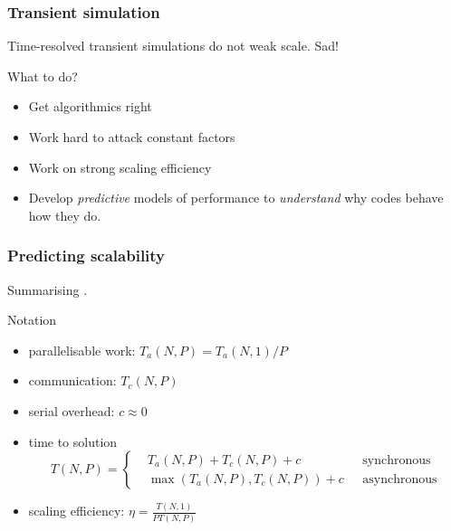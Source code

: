\documentclass[presentation]{beamer}
\begin{document}
\begin{frame}
  \frametitle{Transient simulation}
  {\large
    Time-resolved transient simulations do not weak scale. Sad!
  }

  \begin{block}{What to do?}
    \begin{itemize}
    \item Get algorithmics right
    \item Work hard to attack constant factors
    \item Work on strong scaling efficiency
    \item Develop \emph{predictive} models of performance to
      \emph{understand} why codes behave how they do.
    \end{itemize}
  \end{block}

\end{frame}

\begin{frame}
  \frametitle{Predicting scalability}

  Summarising \textcite{Fischer:2015}.
  
  \begin{block}{Notation}
    \begin{itemize}
    \item parallelisable work: $T_a(N, P) = T_a(N, 1)/P$

    \item communication: $T_c(N, P)$

    \item serial overhead: $c \approx 0$

    \item time to solution
      \begin{equation*}
        T(N, P) = \left\{
          \begin{aligned}
            &T_a(N, P) + T_c(N, P) + c &\text{ synchronous}\\
            &\max(T_a(N, P), T_c(N, P)) + c\,\,&\text{ asynchronous}
          \end{aligned}\right.
      \end{equation*}

    \item scaling efficiency: $\eta = \frac{T(N, 1)}{PT(N,P)}$
  \end{itemize}
  \end{block}
\end{frame}
\end{document}
